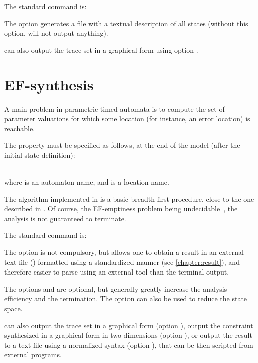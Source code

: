 The standard command is:


The option  generates a file with a textual description of all states (without this option, \imitator{} will not output anything).

\imitator{} can also output the trace set in a graphical form using option .


\section{EF-synthesis}\label{ss:mode:EFsynth}

A main problem in parametric timed automata is to compute the set of parameter valuations for which some location (for instance, an error location) is reachable.

The property must be specified as follows, at the end of the model (after the initial state definition):

\\
where  is an automaton name, and  is a location name.

The algorithm \EFsynth{} implemented in \imitator{} is a basic breadth-first procedure, close to the one described in \cite{JLR15}.
Of course, the EF-emptiness problem being undecidable~\cite{AHV93}, the analysis is not guaranteed to terminate.

The standard command is:



The option  is not compulsory, but allows one to obtain a result in an external text file () formatted using a standardized manner (see \cref{chapter:result}), and therefore easier to parse using an external tool than the terminal output.

The options  and  are optional, but generally greatly increase the analysis efficiency and the termination.
The option  can also be used to reduce the state space.

\imitator{} can also
	output the trace set in a graphical form (option ),
	output the constraint synthesized in a graphical form in two dimensions (option ),
	or
	output the result to a text file using a normalized syntax (option ), that can be then scripted from external programs.


